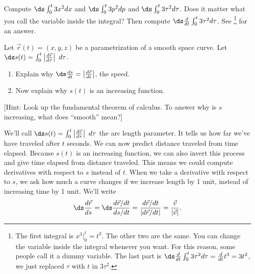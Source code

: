 \begin{review*}
 Compute $\ds \int_0^t 3x^2 dx$ and $\ds \int_0^t 3p^2 dp$ and $\ds \int_0^t 3\tau^2 d\tau$. 
 Does it matter what you call the variable inside the integral? 
 Then compute $\ds\frac{d}{dt} \int_0^t 3\tau^2 d\tau$. See 
\footnote{
The first integral is $x^3|_0^t = t^3$. The other two are the same. You can change the variable inside the integral whenever you want.  For this reason, some people call it a dummy variable. 
The last part is $\ds\frac{d}{dt} \int_0^t 3\tau^2 d\tau = \frac{d}{dt} t^3 = 3t^2$, 
we just replaced $\tau$ with $t$ in $3\tau^2$.}
for an answer. 
\end{review*}


\begin{problem}\label{fundamental theorem of calculus as it applies to arc length parameter}
%
 Let $\vec r(t)=(x,y,z)$ be a parametrization of a smooth space curve. Let $\ds s(t)=\int_0^t \left|\frac {d\vec r}{d\tau} \right|\ d\tau$.  
\begin{enumerate}
	\item Explain why $\ds\frac{ds}{dt} = \left|\frac {d\vec r}{dt} \right|$, the speed. 
	\item Now explain why $s(t)$ is an increasing function.
\end{enumerate}

 [Hint: Look up the fundamental theorem of calculus. To answer why is $s$ increasing, what does ``smooth'' mean?] 
\end{problem}

We'll call $\ds s(t)=\int_0^t \left|\frac {d\vec r}{d\tau}\right|\ d\tau$ the arc length parameter.  It tells us how far we've have traveled after $t$ seconds. We can now predict distance traveled from time elapsed. Because $s(t)$ is an increasing function, we can also invert this process and give time elapsed from distance traveled. This means we could compute derivatives with respect to $s$ instead of $t$.  
When we take a derivative with respect to $s$, we ask how much a curve changes if we increase length by 1 unit, instead of increasing time by 1 unit.  We'll write
$$\ds\frac{d\vec r}{ds} =\ds\frac{d\vec r/dt}{ds/dt} = \frac{d\vec r/dt}{|d\vec r/dt|} = \frac{\vec v}{|\vec{v}|}.$$

